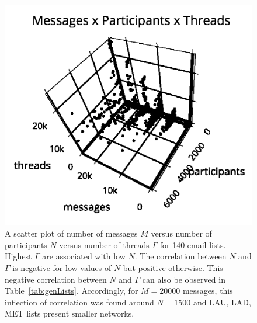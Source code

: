 \documentclass[%
	aip,
	jmp,%
	amsmath,amssymb,
	reprint,%
]{revtex4-1}
\begin{document}
\begin{figure}
   \centering
   \includegraphics[trim={0 0 0 1cm},clip,width=.7\columnwidth]{figs/mpgamma2}
	\caption{A scatter plot of number of messages $M$ versus number of participants $N$ versus number of threads $\Gamma$ for 140 email lists.
Highest $\Gamma$ are associated with low $N$.
The correlation between $N$ and $\Gamma$ is negative for low values of $N$ but positive otherwise.
This negative correlation between $N$ and $\Gamma$ can also be observed in Table~\ref{tab:genLists}.
Accordingly,
for $M=20000$ messages, this inflection
of correlation 
was found around $N=1500$
and LAU, LAD, MET lists 
present smaller networks.}
	\label{fig:nmgamma3d}
\end{figure}
\end{document}
